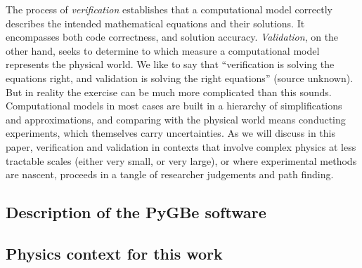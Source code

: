 The process of \emph{verification} establishes that a computational model correctly describes the intended mathematical equations and their solutions.
It encompasses both code correctness, and solution accuracy.
\emph{Validation}, on the other hand, seeks to determine to which measure a computational model represents the physical world. 
We like to say that ``verification is solving the equations right, and validation is solving the right equations'' (source unknown). 
But in reality the exercise can be much more complicated than this sounds. 
Computational models in most cases are built in a hierarchy of simplifications and approximations, and comparing with the physical world means conducting experiments, which themselves carry uncertainties. 
As we will discuss in this paper, verification and validation in contexts that involve complex physics at less tractable scales (either very small, or very large), or where experimental methods are nascent, proceeds in a tangle of researcher judgements and path finding. 



\subsection{Description of the PyGBe software}

\subsection{Physics context for this work}